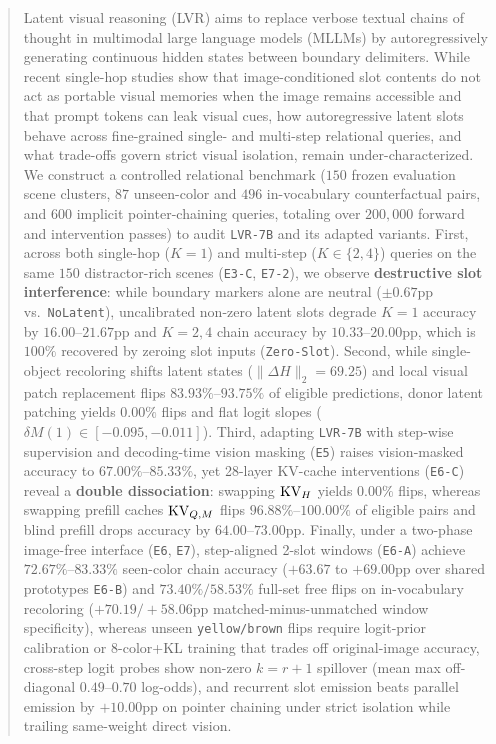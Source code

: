 \begin{abstract}
Latent visual reasoning (LVR) aims to replace verbose textual chains of thought in multimodal large language models (MLLMs) by autoregressively generating continuous hidden states between boundary delimiters. While recent single-hop studies show that image-conditioned slot contents do not act as portable visual memories when the image remains accessible and that prompt tokens can leak visual cues, how autoregressive latent slots behave across fine-grained single- and multi-step relational queries, and what trade-offs govern strict visual isolation, remain under-characterized. We construct a controlled relational benchmark ($150$ frozen evaluation scene clusters, $87$ unseen-color and $496$ in-vocabulary counterfactual pairs, and $600$ implicit pointer-chaining queries, totaling over $200,000$ forward and intervention passes) to audit \texttt{LVR-7B} and its adapted variants. First, across both single-hop ($K=1$) and multi-step ($K \in \{2, 4\}$) queries on the same $150$ distractor-rich scenes (\texttt{E3-C}, \texttt{E7-2}), we observe \textbf{destructive slot interference}: while boundary markers alone are neutral ($\pm 0.67$pp vs.\ \texttt{NoLatent}), uncalibrated non-zero latent slots degrade $K=1$ accuracy by $16.00$--$21.67$pp and $K=2, 4$ chain accuracy by $10.33$--$20.00$pp, which is $100\%$ recovered by zeroing slot inputs (\texttt{Zero-Slot}). Second, while single-object recoloring shifts latent states ($\|\Delta H\|_2 = 69.25$) and local visual patch replacement flips $83.93\%$--$93.75\%$ of eligible predictions, donor latent patching yields $0.00\%$ flips and flat logit slopes ($\delta M(1) \in [-0.095, -0.011]$). Third, adapting \texttt{LVR-7B} with step-wise supervision and decoding-time vision masking (\texttt{E5}) raises vision-masked accuracy to $67.00\%$--$85.33\%$, yet 28-layer KV-cache interventions (\texttt{E6-C}) reveal a \textbf{double dissociation}: swapping $\KV_H$ yields $0.00\%$ flips, whereas swapping prefill caches $\KV_{Q,M}$ flips $96.88\%$--$100.00\%$ of eligible pairs and blind prefill drops accuracy by $64.00$--$73.00$pp. Finally, under a two-phase image-free interface (\texttt{E6}, \texttt{E7}), step-aligned 2-slot windows (\texttt{E6-A}) achieve $72.67\%$--$83.33\%$ seen-color chain accuracy ($+63.67$ to $+69.00$pp over shared prototypes \texttt{E6-B}) and $73.40\%/58.53\%$ full-set free flips on in-vocabulary recoloring ($+70.19/+58.06$pp matched-minus-unmatched window specificity), whereas unseen \texttt{yellow/brown} flips require logit-prior calibration or 8-color+KL training that trades off original-image accuracy, cross-step logit probes show non-zero $k=r+1$ spillover (mean max off-diagonal $0.49$--$0.70$ log-odds), and recurrent slot emission beats parallel emission by $+10.00$pp on pointer chaining under strict isolation while trailing same-weight direct vision.
\end{abstract}
